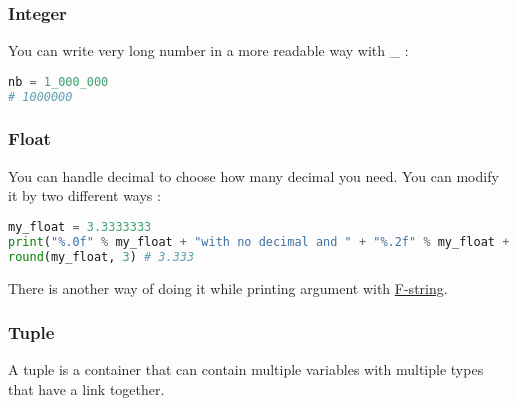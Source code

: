 \documentclass[a4paper, 12pt, titlepage]{scrartcl} %
\begin{document}
\subsubsection{Integer}
You can write very long number in a more readable way with \_ : 
\begin{lstlisting}[language=Python]
nb = 1_000_000
# 1000000
\end{lstlisting} \vspace{5mm}

\subsubsection{Float}
You can handle decimal to choose how many decimal you need. You can modify it by two different ways : 
\begin{lstlisting}[language=Python]
my_float = 3.3333333
print("%.0f" % my_float + "with no decimal and " + "%.2f" % my_float + "with two decimals") #3 with no decimal and 3.33 with two decimals
round(my_float, 3) # 3.333
\end{lstlisting} \vspace{5mm}

There is another way of doing it while printing argument with \hyperref[subsec:F-string]{F-string}.

\subsubsection{Tuple}
A tuple is a container that can contain multiple variables with multiple types that have a link together. 
\end{document}
